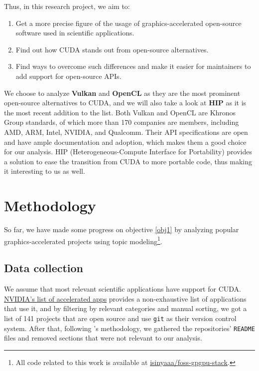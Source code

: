 \documentclass[12pt]{article}
\begin{document}
Thus, in this research project, we aim to:
\begin{enumerate}
    \item\label{obj1} Get a more precise figure of the usage of
        graphics-accelerated open-source software used in scientific
        applications.
    \item\label{obj2} Find out how CUDA stands out from open-source
      alternatives.
    \item\label{obj3} Find ways to overcome such differences and make it easier
        for maintainers to add support for open-source APIs.
\end{enumerate}

We choose to analyze \textbf{Vulkan} and \textbf{OpenCL} as they are the most
prominent open-source alternatives to CUDA, and we will also take a look at
\textbf{HIP} as it is the most recent addition to the list.
Both Vulkan and OpenCL are Khronos Group standards, of which more than 170
companies are members, including AMD, ARM, Intel, NVIDIA, and Qualcomm.
Their API specifications are open and have ample documentation and adoption,
which makes them a good choice for our analysis.
HIP (Heterogeneous-Compute Interface for Portability) provides a solution to
ease the transition from CUDA to more portable code, thus making it interesting
to us as well.

\section{Methodology} \label{sec:methodology}

So far, we have made some progress on objective \ref{obj1} by analyzing popular
graphics-accelerated projects using topic modeling\footnote{
    All code related to this work is available at \href{https://github.com/isinyaaa/foss-gpgpu-stack}{isinyaaa/foss-gpgpu-stack}.
}.

\subsection{Data collection} \label{sec:methodology:data-collection}

We assume that most relevant scientific applications have support for CUDA.
\href{https://nvidia.com/en-us/gpu-accelerated-applications}{NVIDIA's list of accelerated apps}
provides a non-exhaustive list of applications that use it, and by filtering by
relevant categories and manual sorting, we got a list of 141 projects that are
open source and use \verb|git| as their version control system.
After that, following \cite{zheng2018measuring}'s methodology, we gathered the
repositories' \verb|README| files and removed sections that were not relevant to
our analysis.
\end{document}
